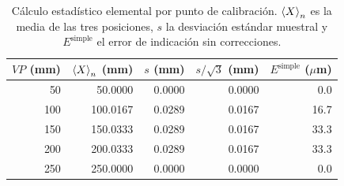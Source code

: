 \begin{table}[H]
\centering
\caption{Cálculo estadístico elemental por punto de calibración. $\left\langle X \right\rangle_n$ es la media de las tres posiciones, $s$ la desviación estándar muestral y $E^{\text{simple}}$ el error de indicación sin correcciones.}
\label{tab:pie-rey-estadistica}
\begin{tabular}{rrrrr}
\toprule
$VP$ (mm) & $\left\langle X \right\rangle_n$ (mm) & $s$ (mm) & $s/\sqrt{3}$ (mm) & $E^{\text{simple}}$ ($\mu$m) \\
\midrule
50 & 50.0000 & 0.0000 & 0.0000 & 0.0 \\
100 & 100.0167 & 0.0289 & 0.0167 & 16.7 \\
150 & 150.0333 & 0.0289 & 0.0167 & 33.3 \\
200 & 200.0333 & 0.0289 & 0.0167 & 33.3 \\
250 & 250.0000 & 0.0000 & 0.0000 & 0.0 \\
\bottomrule
\end{tabular}
\end{table}
